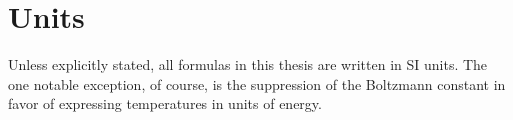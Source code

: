 \section{Units}
Unless explicitly stated, all formulas in this thesis are written in SI units.
The one notable exception, of course,
is the suppression of the Boltzmann constant
in favor of expressing temperatures in units of energy.




